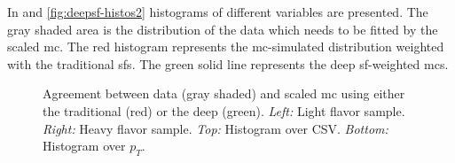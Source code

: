 In  and \ref{fig:deepsf-histos2} histograms of different variables are presented. The gray shaded area is the distribution of the data which needs to be fitted by the scaled \gls{mc}. The red histogram represents the \gls{mc}-simulated distribution weighted with the traditional \glspl{sf}. The green solid line represents the deep \gls{sf}-weighted \glspl{mc}.
\begin{figure}[ht!]
    \centering
    \begin{minipage}{0.49\textwidth}
    \end{minipage}
    \begin{minipage}{0.49\textwidth}
    \end{minipage}

    \begin{minipage}{0.49\textwidth}
    \end{minipage}
    \begin{minipage}{0.49\textwidth}
    \end{minipage}
    \caption{Agreement between data (gray shaded) and scaled \gls{mc} using either the traditional \sfs{} (red) or the deep \sfs{} (green). \emph{Left:} Light flavor sample. \emph{Right:} Heavy flavor sample. \emph{Top:} Histogram over CSV\@. \emph{Bottom:} Histogram over \(p_T\).}\label{fig:deepsf-histos}
\end{figure}
